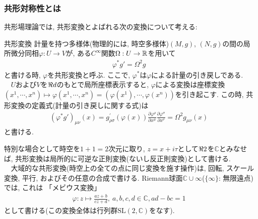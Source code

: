 \subsubsection{共形対称性とは}
共形場理論では, 共形変換とよばれる次の変換について考える: 
\begin{definition}{共形変換}
    計量を持つ多様体(物理的には, 時空多様体)$(M, g)$, $(N, g)$の間の局所微分同相$\varphi: U\to V$が, 
    ある$C^\infty$関数$\Omega: U\to \mathbb{R}$を用いて
    \begin{align}
        \varphi^{*}g' = \Omega^2 g
    \end{align}
    と書ける時, $\varphi$を共形変換と呼ぶ. 
    ここで, $\varphi^*$は$\varphi$による計量の引き戻しである. \\
    　$U$および$V$を$\real{d}$のもとで局所座標表示すると, $\varphi$による変換は座標変換
    $(x^1, \cdots, x^n)\mapsto \varphi(x^1, \cdots, x^n)=(\varphi(x^1), \cdots, \varphi(x^n))$を引き起こす. 
    この時, 共形変換の定義式(計量の引き戻しに関する式)は
    \begin{align}
        (\varphi^{*}g')_{\mu\nu}(x)=g^{'}_{\rho\sigma}(\varphi(x))\frac{\partial \varphi^\rho}{\partial x^\mu}\frac{\partial\varphi^\sigma}{\partial x^\nu}
        =\Omega^2 g_{\mu\nu}(x)
    \end{align}
    と書ける. 
\end{definition}
特別な場合として時空を$1+1=2$次元に取り, $z=x+i\tau$として$\real{2}$を$\mathbb{C}$とみなせば, 
共形変換は局所的に可逆な正則変換(ないし反正則変換)として書ける. \\
　大域的な共形変換(時空上の全ての点に同じ変換を施す操作)は, 回転, スケール変換, 平行, およびその任意の合成で書ける. Riemann球面$\mathbb{C}\cup {\infty}$($\{\infty\}$: 無限遠点)では, これは
「メビウス変換」
\begin{align}
    \varphi: z\mapsto \frac{az + b}{cz + d}, ~ a, b, c, d\in \mathbb{C}, ad-bc=1
    \label{Mobius}
\end{align}
として書ける(この変換全体は行列群$\mathrm{SL}(2, \mathbb{C})$をなす). 
